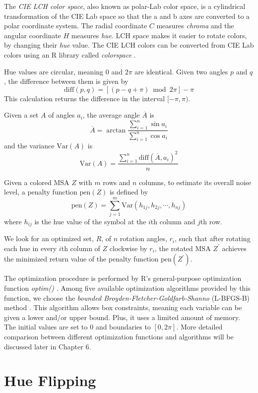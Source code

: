The \emph{CIE LCH color space}, also known as polar-Lab color space, is a cylindrical transformation of the CIE Lab space so that the a and b axes are converted to a polar coordinate system. The radial coordinate $C$ measures \emph{chroma} and the angular coordinate $H$ measures \emph{hue}. LCH space makes it easier to rotate colors, by changing their \emph{hue} value. The CIE LCH colors can be converted from CIE Lab colors using an R library called \emph{colorspace} \cite{Ihaka:2009aa,Zeileis:2009aa}.

Hue values are circular, meaning $0$ and $2\pi$ are identical. Given two angles $p$ and $q$, the difference between them is given by $$\mathrm{diff}(p,q) = [(p - q + \pi) \bmod 2\pi] - \pi$$ This calculation returns the difference in the interval $[-\pi, \pi)$.

Given a set $A$ of angles $a_i$, the average angle $\overline{A}$ is $$\overline{A}=\arctan{\frac{\displaystyle\sum_{i=1}^n \sin{a_i}}{\displaystyle\sum_{i=1}^n \cos{a_i}}}$$ and the variance $\mathrm{Var}(A)$ is $$\mathrm{Var}(A)=\frac{\displaystyle\sum_{i=1}^n \mathrm{diff}(\overline{A},a_i)^2}{n}$$

Given a colored MSA $Z$ with $m$ rows and $n$ columns, to estimate its overall noise level, a penalty function $\mathrm{pen}(Z)$ is defined by $$\mathrm{pen}(Z)=\displaystyle\sum_{j=1}^m \mathrm{Var}(h_{1j},h_{2j},\cdots,h_{nj})$$ where $h_{ij}$ is the hue value of the symbol at the $i$th column and $j$th row.

We look for an optimized set, $R$, of $n$ rotation angles, $r_i$, such that after rotating each hue in every $i$th column of $Z$ clockwise by $r_i$, the rotated MSA $Z^\prime$ achieves the minimized return value of the penalty function $\mathrm{pen}(Z^\prime)$.

The optimization procedure is performed by R's general-purpose optimization function \emph{optim()} \cite{R2009aa}. Among five available optimization algorithms provided by this function, we choose the \emph{bounded Broyden-Fletcher-Goldfarb-Shanno} (L-BFGS-B) method \cite{Byrd:1995aa}. This algorithm allows box constraints, meaning each variable can be given a lower and/or upper bound. Plus, it uses a limited amount of memory. The initial values are set to 0 and boundaries to $[0, 2\pi]$. More detailed comparison between different optimization functions and algorithms will be discussed later in Chapter 6.

\section{Hue Flipping}

